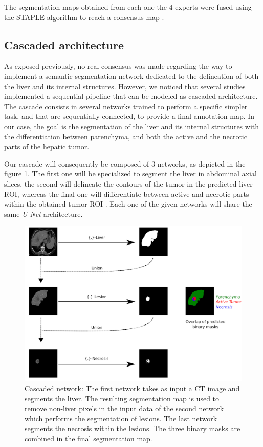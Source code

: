 \documentclass[]{article}
\begin{document}
	The segmentation maps obtained from each one the 4 experts were fused
	using the STAPLE algorithm to reach a consensus map \cite{Warfield2004}.
	
	\subsection*{Cascaded architecture}
	
	As exposed previously, no real consensus was made regarding the way to
	implement a semantic segmentation network dedicated to the delineation
	of both the liver and its internal structures. However, we noticed that
	several studies implemented a sequential pipeline that can be modeled as
	cascaded architecture. The cascade consists in several networks trained
	to perform a specific simpler task, and that are sequentially connected, to
	provide a final annotation map. In our case, the goal is the
	segmentation of the liver and its internal structures with the
	differentiation between parenchyma, and both the active and the necrotic
	parts of the hepatic tumor.
	
	Our cascade will consequently be composed of 3 networks, as depicted
	in the figure \ref{CARS_Cascade}. The first one will be specialized to segment the liver in
	abdominal axial slices, the second will delineate the contours of the
	tumor in the predicted liver ROI, whereas the final one will
	differentiate between active and necrotic parts within the obtained
	tumor ROI \cite{Ouhmich2019}.
	Each one of the given networks will share the same \emph{U-Net}
	architecture.
	
	\begin{figure}[th!]
		\centering
		\includegraphics[width=0.7\linewidth]{images/image26}
		\caption{Cascaded network: The first network takes as input a CT image and segments the liver. The resulting segmentation map is used to remove non-liver pixels in the input data of the second network which performs the segmentation of lesions. The last network segments the necrosis within the lesions. The three binary masks are combined in the final segmentation map.}
		\label{CARS_Cascade}
	\end{figure}
	
\end{document}
